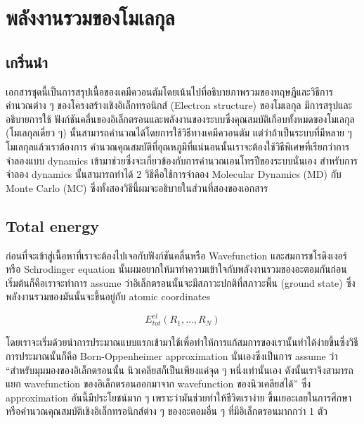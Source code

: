 
\chapter{พลังงานรวมของโมเลกุล}

\section{เกริ่นนำ}

เอกสารชุดนี้เป็นการสรุปเนื้อของเคมีควอนตัมโดยเน้นไปที่อธิบายภาพรวมของทฤษฎีและวิธีการคำนวณต่าง ๆ 
ของโครงสร้างเชิงอิเล็กทรอนิกส์ (Electron structure) ของโมเลกุล มีการสรุปและอธิบายการใช้%
ฟังก์ชันคลื่นของอิเล็กตรอนและพลังงานของระบบซึ่งคุณสมบัติเกือบทั้งหมดของโมเลกุล (โมเลกุลเดี่ยว ๆ) 
นั้นสามารถคำนวณได้โดยการใช้วิธีทางเคมีควอนตัม แต่ว่าถ้าเป็นระบบที่มีหลาย ๆ โมเลกุลแล้วเราต้องการ%
คำนวณคุณสมบัติที่อุณหภูมิที่แน่นอนนั้นเราจะต้องใช้วิธีพิเศษที่เรียกว่าการจำลองแบบ dynamics 
เข้ามาช่วยซึ่งจะเกี่ยวข้องกับการคำนวณเอนโทรปีของระบบนั่นเอง สำหรับการจำลอง dynamics 
นั้นสามารถทำได้ 2 วิธีคือใช้การจำลอง Molecular Dynamics (MD) กับ Monte Carlo (MC) 
ซึ่งทั้งสองวิธีนี้ผมจะอธิบายในส่วนที่สองของเอกสาร

\section{Total energy}

ก่อนที่จะเข้าสู่เนื้อหาที่เราจะต้องไปเจอกับฟังก์ชันคลื่นหรือ Wavefunction และสมการชโรดิงเงอร์หรือ Schrodinger 
equation นั้นผมอยากให้มาทำความเข้าใจกับพลังงานรวมของอะตอมกันก่อน เริ่มต้นก็คือเราจะทำการ assume 
ว่าอิเล็กตรอนนั้นจะมีสภาวะปกติที่สภาวะพื้น (ground state) ซึ่งพลังงานรวมของมันนั้นจะขึ้นอยู่กับ atomic coordinates

\begin{equation}
    E^{el}_{tot}(R_{1}, \dots, R_{N})
\end{equation}

โดยเราจะเริ่มด้วยนำการประมาณแบบแรกเข้ามาใช้เพื่อทำให้การแก้สมการของเรานั้นทำได้ง่ายขึ้นซึ่งวิธีการประมาณนั้นก็คือ 
Born-Oppenheimer approximation นั่นเองซึ่งเป็นการ assume ว่า \enquote{สำหรับมุมมองของอิเล็กตรอนนั้น 
นิวเคลียสก็เป็นเพียงแค่จุด ๆ หนึ่งเท่านั้นเอง ดังนั้นเราจึงสามารถแยก wavefunction ของอิเล็กตรอนออกมาจาก 
wavefunction ของนิวเคลียสได้} ซึ่ง approximation อันนี้มีประโยชน์มาก ๆ เพราะว่ามันช่วยทำให้ชีวิตเราง่าย%
ขึ้นเยอะเลยในการศึกษาหรือคำนวณคุณสมบัติเชิงอิเล็กทรอนิกส์ต่าง ๆ ของอะตอมอื่น ๆ ที่มีอิเล็กตรอนมากกว่า 1 ตัว

